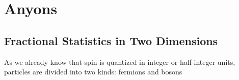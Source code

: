 \chapter{Anyons}

\section{Fractional Statistics in Two Dimensions}

As we already know that spin is quantized in integer or half-integer units, particles are divided into two kinds: fermions and bosons





























